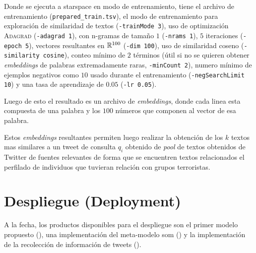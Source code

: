 Donde se ejecuta a \gls{starspace} en modo de entrenamiento, tiene el archivo de entrenamiento (\texttt{prepared\_train.tsv}), el modo de entrenamiento para exploración de similaridad de textos (\texttt{-trainMode 3}), uso de optimización \textsc{Adagrad} (\texttt{-adagrad 1}), con n-gramas de tamaño $1$ (\texttt{-nrams 1}), $5$ iteraciones (\texttt{-epoch 5}), vectores resultantes en $\mathbb{R}^{100}$ (\texttt{-dim 100}), uso de similaridad coseno (\texttt{-similarity cosine}), conteo mínimo de $2$ términos (útil si no se quieren obtener \emph{embeddings} de palabras extremadamente raras, \texttt{-minCount 2}), numero mínimo de ejemplos negativos como $10$ usado durante el entrenamiento (\texttt{-negSearchLimit 10}) y una tasa de aprendizaje de $0.05$ (\texttt{-lr 0.05}).

Luego de esto el resultado es un archivo de \emph{embeddings}, donde cada linea esta compuesta de una palabra y los $100$ números que componen al vector de esa palabra.

Estos \emph{embeddings} resultantes permiten luego realizar la obtención de los $k$ textos mas similares a un tweet de consulta $q_i$ obtenido de \emph{pool} de textos obtenidos de Twitter de fuentes relevantes de forma que se encuentren textos relacionados el perfilado de individuos que tuvieran relación con grupos terroristas.


\section{Despliegue (Deployment)}
A la fecha, los productos disponibles para el despliegue son el primer modelo propuesto (), una implementación del meta-modelo \gls{som} () y la implementación de la recolección de información de tweets ().

